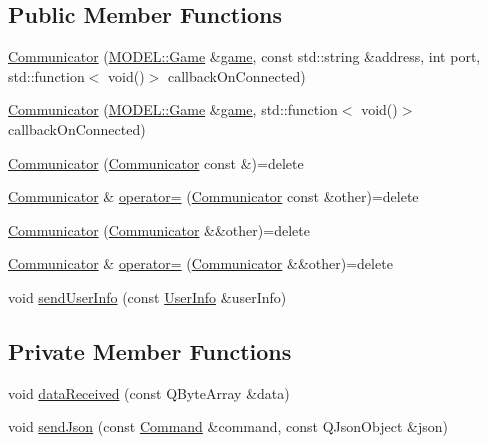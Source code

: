 \subsection*{Public Member Functions}
\begin{DoxyCompactItemize}
\item 
\hyperlink{classMODEL_1_1Communicator_a2993409e2e41d9363c76e59b054df1ed}{Communicator} (\hyperlink{classMODEL_1_1Game}{M\+O\+D\+E\+L\+::\+Game} \&\hyperlink{classMODEL_1_1Communicator_a1018ef7ed7f7714ef648545d209b9ff4}{game}, const std\+::string \&address, int port, std\+::function$<$ void()$>$ callback\+On\+Connected)
\item 
\hyperlink{classMODEL_1_1Communicator_ad11952ffbf95dda14e718d936e26aa1c}{Communicator} (\hyperlink{classMODEL_1_1Game}{M\+O\+D\+E\+L\+::\+Game} \&\hyperlink{classMODEL_1_1Communicator_a1018ef7ed7f7714ef648545d209b9ff4}{game}, std\+::function$<$ void()$>$ callback\+On\+Connected)
\item 
\hyperlink{classMODEL_1_1Communicator_ae1ebbaf619b559917bb5d0508c604883}{Communicator} (\hyperlink{classMODEL_1_1Communicator}{Communicator} const \&)=delete
\item 
\hyperlink{classMODEL_1_1Communicator}{Communicator} \& \hyperlink{classMODEL_1_1Communicator_a92705f86fea309452a1da1eb027577e9}{operator=} (\hyperlink{classMODEL_1_1Communicator}{Communicator} const \&other)=delete
\item 
\hyperlink{classMODEL_1_1Communicator_a9354967a93e7ec6136a5c8ece2e755d2}{Communicator} (\hyperlink{classMODEL_1_1Communicator}{Communicator} \&\&other)=delete
\item 
\hyperlink{classMODEL_1_1Communicator}{Communicator} \& \hyperlink{classMODEL_1_1Communicator_ae0fb22dd825e3817b1a5d1846f916197}{operator=} (\hyperlink{classMODEL_1_1Communicator}{Communicator} \&\&other)=delete
\item 
void \hyperlink{classMODEL_1_1Communicator_addda61885a1ef23ed692f15ca56f43c3}{send\+User\+Info} (const \hyperlink{classUserInfo}{User\+Info} \&user\+Info)
\end{DoxyCompactItemize}
\subsection*{Private Member Functions}
\begin{DoxyCompactItemize}
\item 
void \hyperlink{classMODEL_1_1Communicator_a7bf1372fe11b00605a91dccdf336e81d}{data\+Received} (const Q\+Byte\+Array \&data)
\item 
void \hyperlink{classMODEL_1_1Communicator_ab9ff7c65f14065e5bdad9cfc7e15ba27}{send\+Json} (const \hyperlink{namespaceMODEL_a2afce0a47a93eee73a314d53e4890153}{Command} \&command, const Q\+Json\+Object \&json)
\end{DoxyCompactItemize}
